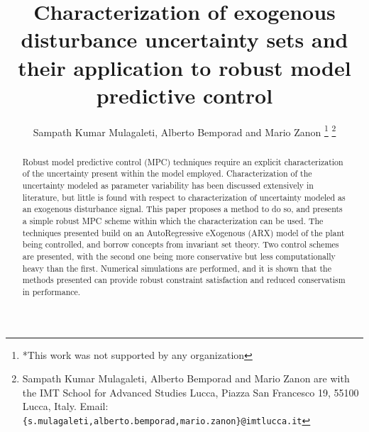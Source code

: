\documentclass[letterpaper, 10 pt, conference]{ieeeconf}  %
\title{\LARGE \bf
Characterization of exogenous disturbance uncertainty sets and their application to robust model predictive control
}
\author{ Sampath Kumar Mulagaleti, Alberto Bemporad and Mario Zanon %
\thanks{*This work was not supported by any organization}%
\thanks{Sampath Kumar Mulagaleti, Alberto Bemporad and Mario Zanon are with
		the IMT School for Advanced Studies Lucca, Piazza San Francesco 19,
		55100 Lucca, Italy. 
		 Email: 
	   {\tt\tiny \{s.mulagaleti,alberto.bemporad,mario.zanon\}@imtlucca.it}  }%
}
\begin{document}
\maketitle
\thispagestyle{empty}
\pagestyle{empty}


\begin{abstract}

Robust model predictive control (MPC) techniques require an explicit characterization of the uncertainty present within the model employed. Characterization of the uncertainty modeled as parameter variability has been discussed extensively in literature, but little is found with respect to characterization of uncertainty modeled as an exogenous disturbance signal. This paper proposes a method to do so, and presents a simple robust MPC scheme within which the characterization can be used. The techniques presented build on an AutoRegressive eXogenous (ARX) model of the plant being controlled, and borrow concepts from invariant set theory. Two control schemes are presented, with the second one being more conservative but less computationally heavy than the first. Numerical simulations are performed, and it is shown that the methods presented can provide robust constraint satisfaction and reduced conservatism in performance.

\end{abstract}


\end{document}
